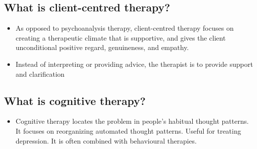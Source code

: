 \documentclass[10pt,letter]{article}
\theoremstyle{plain}
\theoremstyle{definition}
\begin{document}
\subsection*{What is client-centred therapy?}
\begin{itemize}
    \item As opposed to psychoanalysis therapy, client-centred therapy focuses on creating a therapeutic climate that is supportive, and gives the client unconditional positive regard, genuineness, and empathy. 
    \item Instead of interpreting or providing advice, the therapist is to provide support and clarification
\end{itemize}
\subsection*{What is cognitive therapy?}
\begin{itemize}
    \item Cognitive therapy locates the problem in people's habitual thought patterns. It focuses on reorganizing automated thought patterns. Useful for treating depression. It is often combined with behavioural therapies. 
\end{itemize}
\end{document}
